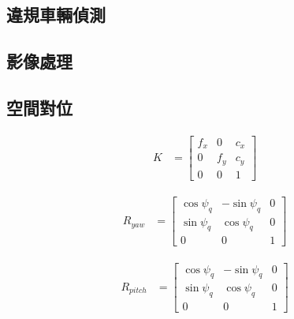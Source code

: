 \documentclass[12pt]{article}       %
\begin{document}
\subsection{違規車輛偵測}
\hspace{2em}


\subsection{影像處理}
\hspace{2em}


\subsection{空間對位}
\hspace{2em}

\begin{align}
    K &=
    \begin{bmatrix}
        f_{x}       & 0             & c_{x}     \\
        0           & f_{y}         & c_{y}     \\
        0           & 0             & 1
    \end{bmatrix} 
    \label{eq:k}
\end{align}

\begin{align}
    R_{yaw} &=
    \begin{bmatrix}
        \cos\psi_{q}   & -\sin\psi_{q}  & 0 \\
        \sin\psi_{q}   & \cos\psi_{q}   & 0 \\
        0              & 0              & 1
    \end{bmatrix} 
    \label{eq:ryaw}
\end{align}

\begin{align}
    R_{pitch} &=
    \begin{bmatrix}
        \cos\psi_{q}   & -\sin\psi_{q}  & 0 \\
        \sin\psi_{q}   & \cos\psi_{q}   & 0 \\
        0              & 0              & 1
    \end{bmatrix} 
    \label{eq:rpitch}
\end{align}
\end{document}
